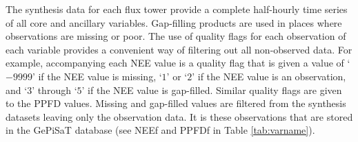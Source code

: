 The synthesis data for each flux tower provide a complete half-hourly time series of all core and ancillary variables.  
Gap-filling products are used in places where observations are missing or poor.  
The use of quality flags for each observation of each variable provides a convenient way of filtering out all non-observed data.  
For example, accompanying each NEE value is a quality flag that is given a value of `$-9999$' if the NEE value is missing, `$1$' or `$2$' if the NEE value is an observation, and `$3$' through `$5$' if the NEE value is gap-filled. 
Similar quality flags are given to the PPFD values.  
Missing and gap-filled values are filtered from the synthesis datasets leaving only the observation data.  
It is these observations that are stored in the GePiSaT database (see NEE\textunderscore f and PPFD\textunderscore f in Table \ref{tab:varname}).

